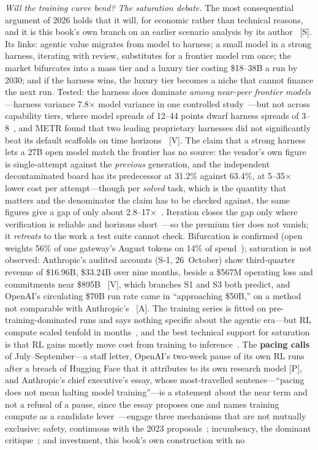 \emph{Will the training curve bend? The saturation debate.} The most consequential argument of 2026 holds that it will, for economic rather than technical reasons, and it is this book's own branch on an earlier scenario analysis by its author~\cite{matsuoka-memory} [S]. Its links: agentic value migrates from model to harness; a small model in a strong harness, iterating with review, substitutes for a frontier model run once; the market bifurcates into a mass tier and a luxury tier costing \$18--38B a run by 2030; and if the harness wins, the luxury tier becomes a niche that cannot finance the next run. Tested: the harness does dominate \emph{among near-peer frontier models}---harness variance 7.8$\times$ model variance in one controlled study~\cite{harness-variance}---but not across capability tiers, where model spreads of 12--44 points dwarf harness spreads of 3--8~\cite{tbench-harness-spread}, and METR found that two leading proprietary harnesses did not significantly beat its default scaffolds on time horizons~\cite{metr-harness} [V]. The claim that a strong harness lets a 27B open model match the frontier has no source: the vendor's own figure is single-attempt against the \emph{previous} generation, and the independent decontaminated board has its predecessor at 31.2\% against 63.4\%, at 5--35$\times$ lower cost per attempt---though per \emph{solved} task, which is the quantity that matters and the denominator the claim has to be checked against, the same figures give a gap of only about 2.8--17$\times$~\cite{qwen38-27b-card,swe-rebench}. Iteration closes the gap only where verification is reliable and horizons short~\cite{test-time-scaling}---so the premium tier does not vanish; it \emph{retreats} to the work a test suite cannot check. Bifurcation is confirmed (open weights 56\% of one gateway's August tokens on 14\% of spend~\cite{vercel-sep26}); saturation is not observed: Anthropic's audited accounts (S-1, 26~October) show third-quarter revenue of \$16.96B, \$33.24B over nine months, beside a \$567M operating loss and commitments near \$895B~\cite{cap-anthropic-s1} [V], which branches S1 and S3 both predict, and OpenAI's circulating \$70B run rate came in ``approaching \$50B,'' on a method not comparable with Anthropic's~\cite{mdl-openai-50bn} [A]. The training series is fitted on pre-training-dominated runs and says nothing specific about the agentic era---but RL compute scaled tenfold in months~\cite{epoch-rl-scaling}, and the best technical support for saturation is that RL gains mostly move cost from training to inference~\cite{ord-rl}. The \textbf{pacing calls} of July--September---a staff letter, OpenAI's two-week pause of its own RL runs after a breach of Hugging Face that it attributes to its own research model [P], and Anthropic's chief executive's essay, whose most-travelled sentence---``pacing does not mean halting model training''---is a statement about the near term and not a refusal of a pause, since the essay proposes one and names training compute as a candidate lever~\cite{pacing-letter,openai-pause,amodei-pacing}---engage three mechanisms that are not mutually exclusive: safety, continuous with the 2023 proposals~\cite{pacing-continuity}; incumbency, the dominant critique~\cite{pacing-readings}; and investment, this book's own construction with no 